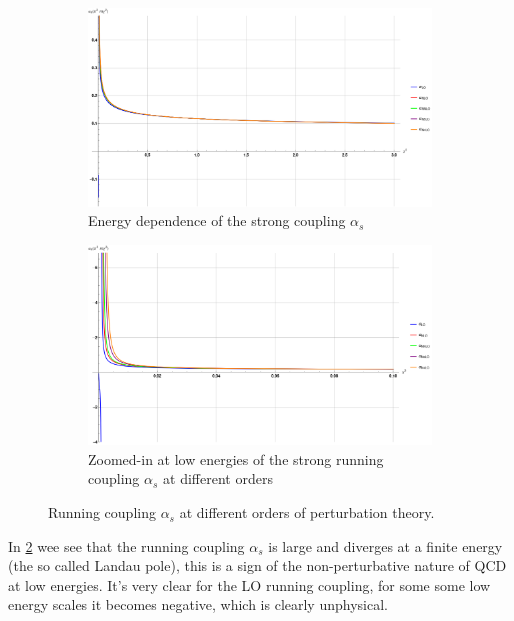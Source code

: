 \documentclass[../main.tex]{subfiles}
\begin{document}
\begin{figure}[htbp]
    \centering
    \begin{subfigure}[b]{0.45\textwidth}
        \includegraphics[width=\textwidth]{figures/alpha_running.png}
        \caption{Energy dependence of the strong coupling $\alpha_s$}
        \label{fig:alpha_running}
    \end{subfigure}
    \hfill
    \begin{subfigure}[b]{0.45\textwidth}
        \includegraphics[width=\textwidth]{figures/alpha_zoom.png}
        \caption{Zoomed-in at low energies of the strong running coupling $\alpha_s$ at different orders}
        \label{fig:alpha_zoom}
    \end{subfigure}
    \caption{Running coupling $\alpha_s$ at different orders of perturbation theory.}
    \label{fig:alpha}
\end{figure}

In \cref{fig:alpha_zoom} wee see that the running coupling $\alpha_s$ is large and diverges at a finite 
energy (the so called Landau pole), this is a sign of the non-perturbative nature of QCD at low energies.
It's very clear for the LO running coupling, for some some low energy scales it becomes negative, which is clearly unphysical.
\end{document}
